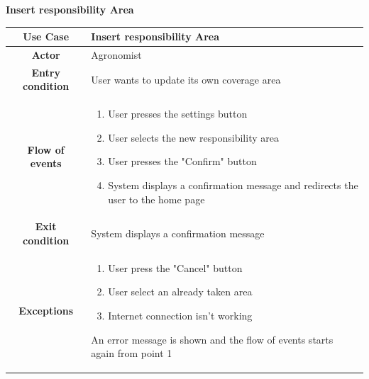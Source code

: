 \documentclass[table, 12pt]{article}
\begin{document}
\begin{itemize}
            \begin{table}[H]
                \item[] \textbf{Insert responsibility Area}
                \item[] 
                \centering
                \begin{tabular}{|c |m{}|}
                    \hline
                    \textbf{Use Case} & Insert responsibility Area\\ \hline
                    \textbf{Actor} & Agronomist\\ \hline
                    \textbf{Entry condition} & User wants to update its own coverage area\\  \hline
                    \textbf{Flow of events} & \begin{enumerate}
                                                \item User presses the settings button
                                                \item User selects the new responsibility area
                                                \item User presses the "Confirm" button 
                                                \item System displays a confirmation message and redirects the user to the home page
                                            \end{enumerate}\\ \hline
                    \textbf{Exit condition} & System displays a confirmation message\\ \hline
                    \textbf{Exceptions} &  \begin{enumerate}
                        \item User press the "Cancel" button
                        \item User select an already taken area
                        \item Internet connection isn't working
                    \end{enumerate}
                    An error message is shown and the flow of events starts again from point 1\\ \hline                    
                \end{tabular}
            \end{table}


\end{itemize}
\end{document}

